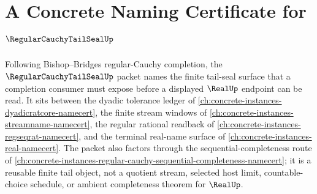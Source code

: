 \chapter{A Concrete Naming Certificate for $\RegularCauchyTailSealUp$}
\label{ch:concrete-instances-regular-cauchy-tail-seal-namecert}

Following Bishop--Bridges regular-Cauchy completion, the $\RegularCauchyTailSealUp$ packet names the finite tail-seal surface that a completion consumer must expose before a displayed $\RealUp$ endpoint can be read. It sits between the dyadic tolerance ledger of \autoref{ch:concrete-instances-dyadicratcore-namecert}, the finite stream windows of \autoref{ch:concrete-instances-streamname-namecert}, the regular rational readback of \autoref{ch:concrete-instances-regseqrat-namecert}, and the terminal real-name surface of \autoref{ch:concrete-instances-real-namecert}. The packet also factors through the sequential-completeness route of \autoref{ch:concrete-instances-regular-cauchy-sequential-completeness-namecert}; it is a reusable finite tail object, not a quotient stream, selected host limit, countable-choice schedule, or ambient completeness theorem for $\RealUp$.

